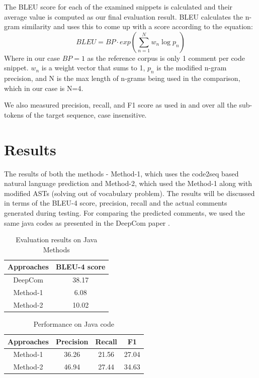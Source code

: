 \documentclass[a4paper,10pt]{article}
\theoremstyle{plain}
\theoremstyle{definition}
\begin{document}
\begin{multicols*}{2}
The BLEU score for each of the examined snippets is calculated and their average value is computed as our final evaluation result. BLEU calculates the n-gram similarity and uses this to come up with a score according to the equation:
$$BLEU = BP \cdot exp \left (\sum^{N}_{n=1}w_n\log p_n   \right )$$
Where in our case $BP = 1$ as the reference corpus is only 1 comment per code snippet. $w_n$ is a weight vector that sums to 1, $p_n$ is the modified n-gram precision, and N is the max length of n-grams being used in the comparison\cite{Papineni:2002:BMA:1073083.1073135}, which in our case is N=4.

We also measured precision, recall, and F1 score as  used in \cite{allamanis2016convolutional} and \cite{alon2019code2vec} over all the sub-tokens of the target sequence, case insensitive.

\section{Results}\label{results}
The results of both the methods - Method-1, which uses the code2seq based natural language prediction and Method-2, which used the Method-1 along with modified ASTs (solving out of vocabulary problem). The results will be discussed in terms of the BLEU-4 score, precision, recall and the actual comments generated during testing. For comparing the predicted comments, we used the same java codes as presented in the DeepCom paper \cite{hu2018deep}.


\begin{table}[H]
\centering
\begin{tabular}{cc}
\hline
Approaches & BLEU-4 score \\ \hline
DeepCom & 38.17 \\
Method-1 & 6.08 \\
Method-2 & 10.02 \\ \hline
\end{tabular}
\caption{Evaluation results on Java Methods}
\label{tab:bleu-table}
\end{table}
\begin{table}[H]
\centering
\begin{tabular}{cccc}
\hline
Approaches & Precision & Recall & F1 \\ \hline
Method-1 & 36.26 & 21.56 & 27.04 \\
Method-2 & 46.94 & 27.44 & 34.63 \\ \hline
\end{tabular}
\caption{Performance on Java code}
\label{tab:prec_recall}
\end{table}


\end{multicols*}
\end{document}
